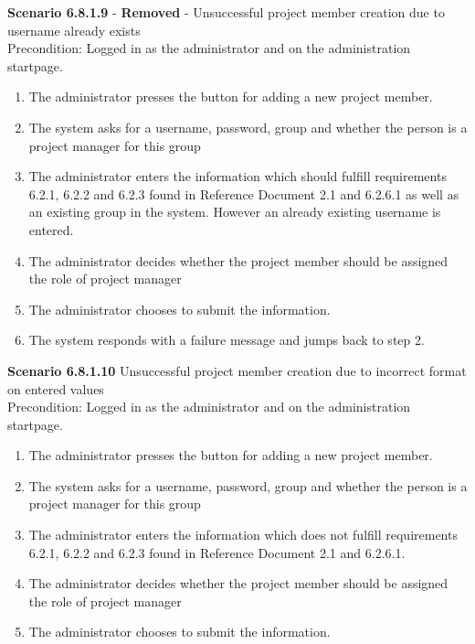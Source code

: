 \documentclass{article}
\begin{document}
\noindent\textbf{Scenario 6.8.1.9} - \textbf{Removed} - Unsuccessful project member creation due to username already exists  \\
Precondition: Logged in as the administrator and on the administration startpage.
\begin{enumerate}
\item The administrator presses the button for adding a new project member.
\item The system asks for a username, password, group and whether the person is a project manager for this group
\item The administrator enters the information which should fulfill requirements 6.2.1, 6.2.2 and 6.2.3 found in Reference Document 2.1 and 6.2.6.1 as well as an existing group in the system. However an already existing username is entered.
\item The administrator decides whether the project member should be assigned the role of project manager
\item The administrator chooses to submit the information.
\item The system responds with a failure message and jumps back to step 2.
\end{enumerate}

\noindent\textbf{Scenario 6.8.1.10} Unsuccessful project member creation due to incorrect format on entered values \\
Precondition: Logged in as the administrator and on the administration startpage.
\begin{enumerate}
\item The administrator presses the button for adding a new project member.
\item The system asks for a username, password, group and whether the person is a project manager for this group
\item The administrator enters the information which does not fulfill requirements 6.2.1, 6.2.2 and 6.2.3 found in Reference Document 2.1 and 6.2.6.1.
\item The administrator decides whether the project member should be assigned the role of project manager
\item The administrator chooses to submit the information.
\end{enumerate}
\end{document}
